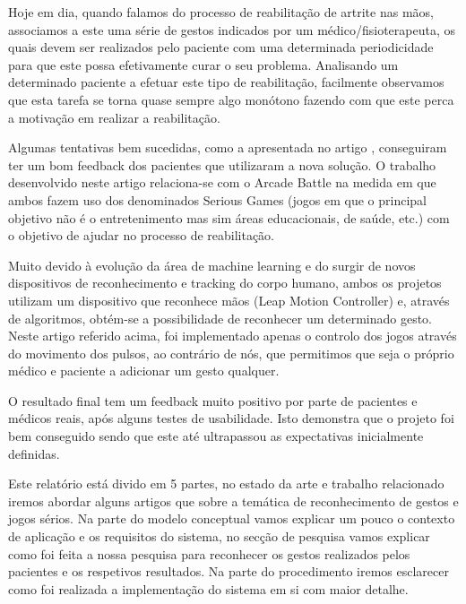 \documentclass{TTUPhD}
\begin{document}

Hoje em dia, quando falamos do processo de reabilitação de artrite nas mãos, associamos a este uma série de gestos indicados por um médico/fisioterapeuta,
os quais devem ser realizados pelo paciente com uma determinada periodicidade para que este possa efetivamente curar o seu problema.
Analisando um determinado paciente a efetuar este tipo de reabilitação, facilmente observamos que esta tarefa se torna quase sempre algo monótono
fazendo com que este perca a motivação em realizar a reabilitação.

Algumas tentativas bem sucedidas, como a apresentada no artigo \cite{rehability},
conseguiram ter um bom feedback dos pacientes que utilizaram a nova solução. O trabalho desenvolvido neste artigo relaciona-se com o Arcade Battle na medida
em que ambos fazem uso dos denominados Serious Games (jogos em que o principal objetivo não é o entretenimento mas sim áreas educacionais, de saúde, etc.) com o
objetivo de ajudar no processo de reabilitação.

Muito devido à evolução da área de machine learning e do surgir de novos dispositivos de reconhecimento e tracking do corpo humano, ambos os projetos
utilizam um dispositivo que reconhece mãos (Leap Motion Controller) e, através de algoritmos, obtém-se a possibilidade de reconhecer um determinado gesto.
Neste artigo referido acima, foi implementado apenas o controlo dos jogos através do movimento dos pulsos, ao contrário de nós, que permitimos
que seja o próprio médico e paciente a adicionar um gesto qualquer.

O resultado final tem um feedback muito positivo por parte de pacientes e médicos reais, após alguns testes de usabilidade.
Isto demonstra que o projeto foi bem conseguido sendo que este até ultrapassou as expectativas inicialmente definidas.

Este relatório está divido em 5 partes, no estado da arte e trabalho relacionado iremos abordar alguns artigos que sobre a temática de reconhecimento de gestos
e jogos sérios. Na parte do modelo conceptual vamos explicar um pouco o contexto de aplicação e os requisitos do sistema, no secção de pesquisa vamos explicar
como foi feita a nossa pesquisa para reconhecer os gestos realizados pelos pacientes e os respetivos resultados. Na parte do procedimento iremos esclarecer como
foi realizada a implementação do sistema em si com maior detalhe.
\end{document}
